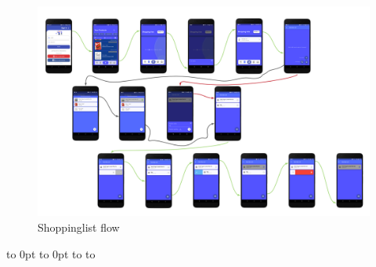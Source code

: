 
\def\fillandplacepagenumber{%
 \par\pagestyle{empty}%
\vbox to 0pt{\vss}\vfill
\vbox to 0pt{\baselineskip0pt
   \hbox to\linewidth{\hss}%
   \setlength{\footskip}{70pt}
   \baselineskip\footskip
   \hbox to\linewidth{%
     \hfil\thepage\hfil}\vss}}

\begin{landscape}
\begin{figure}[h]
\vspace*{-2cm}
\noindent
\centering
\centerline{\includegraphics[scale = 0.65]{./Images/flowdiagram/shopping_list.png}}
\vspace*{-1cm}
    \caption{Shoppinglist flow}
    \vspace*{-12cm}
\end{figure}
\fillandplacepagenumber
\end{landscape}
